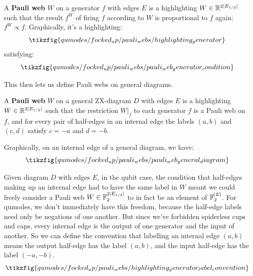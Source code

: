 \begin{definition}\label{defn:pauli_web_generator}
    A \textbf{Pauli web} $W$ on a generator $f$ with edges $E$ is a highlighting $W \in \mathbb{R}^{2|E_{1/2}|}$ such that the result $f^W$ of firing $f$ according to $W$ is proportional to $f$ again: $f^W \propto f$.
    Graphically, it's a highlighting:
    \begin{equation}\label{eq:pauli_web_generator_highlighting}
        \tikzfig{qumodes/focked_up/pauli_webs/highlighting_generator}
    \end{equation}
    satisfying:
    \begin{equation}\label{eq:pauli_web_generator_condition}
        \tikzfig{qumodes/focked_up/pauli_webs/pauli_web_generator_condition}
    \end{equation}
\end{definition}

This then lets us define Pauli webs on general diagrams.

\begin{definition}\label{defn:pauli_web_general_diagram}
    A \textbf{Pauli web} $W$ on a general ZX-diagram $D$ with edges $E$ is a highlighting $W \in \mathbb{R}^{2|E_{1/2}|}$ such that the restriction $W|_f$ to each generator $f$ is a Pauli web on $f$, and for every pair of half-edges in an internal edge the labels $(a, b)$ and $(c, d)$ satisfy $c = -a$ and $d = -b$.
\end{definition}
Graphically, on an internal edge of a general diagram, we have:
\begin{equation}\label{eq:pauli_web_general_diagram_conditions}
    \tikzfig{qumodes/focked_up/pauli_webs/pauli_web_general_diagram}
\end{equation}

Given diagram $D$ with edges $E$, in the qubit case, the condition that half-edges making up an internal edge had to have the same label in $W$ meant we could freely consider a Pauli web $W \in \mathbb{F}_2^{2|E_{1/2}|}$ to in fact be an element of $\mathbb{F}_2^{|E|}$.
For qumodes, we don't immediately have this freedom, because the half-edge labels need only be negations of one another.
But since we've forbidden spiderless cups and caps, every internal edge is the output of one generator and the input of another.
So we can define the convention that labelling an internal edge $(a, b)$ means the output half-edge has the label $(a, b)$, and the input half-edge has the label $(-a, -b)$.
\begin{equation}
    \tikzfig{qumodes/focked_up/pauli_webs/highlighting_generator_label_convention}
\end{equation}

